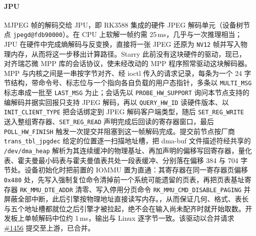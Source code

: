 \paragraph{JPU}
MJPEG 帧的解码交给 JPU，即 RK3588 集成的硬件 JPEG 解码单元（设备树节点 \texttt{jpegd@fdb90000}）。在 CPU 上软解一帧约需 25\,ms，几乎与一次推理相当；JPU 在硬件中完成熵解码与反变换，直接将一张 JPEG 还原为 \texttt{NV12} 帧并写入物理内存，从而将这一步移出计算路径。Starry 此前没有这块硬件的驱动，现已，对齐瑞芯微 MPP 库的会话协议，使未经改动的 MPP 程序照常驱动这块解码器。MPP 与内核之间是一串按字节对齐、经 ioctl 传入的请求记录，每条为一个 24 字节结构，带命令号、标志位与一个指向各自负载的用户态指针，多条以 \texttt{MULTI\_MSG} 标志串成一批至 \texttt{LAST\_MSG} 为止；会话先以 \texttt{PROBE\_HW\_SUPPORT} 询问本节点支持的编解码并据实回报只支持 JPEG 解码，再以 \texttt{QUERY\_HW\_ID} 读硬件版本、以 \texttt{INIT\_CLIENT\_TYPE} 把会话绑定到 JPEG 解码客户端类型，随后 \texttt{SET\_REG\_WRITE} 送入整组寄存器、\texttt{SET\_REG\_READ} 声明完成后回读的寄存器窗口，最后 \texttt{POLL\_HW\_FINISH} 触发一次提交并阻塞到这一帧解码完成。提交前节点按厂商 \texttt{trans\_tbl\_jpgdec} 给定的位置逐一扫描地址槽，把 dma-buf 文件描述符经共享的 \texttt{/dev/dma\_heap} 解析为其连续缓冲的物理基址、再加声明的偏移写回寄存器，量化表、霍夫曼最小码表与霍夫曼值表共处一段表缓冲、分别落在偏移 384 与 704 字节处。设备初始化时把前置的 IOMMU 置为直通：其寄存器在同一寄存器页偏移 \texttt{0x480} 处，先写入强制复位命令清掉前一个系统可能遗留的页表，再把页表基址寄存器 \texttt{RK\_MMU\_DTE\_ADDR} 清零、写入停用分页命令 \texttt{RK\_MMU\_CMD\_DISABLE\_PAGING} 并屏蔽全部中断，此后引擎按物理地址直接读写内存。，从而保证几何、格式、表长与五个地址槽都就位之后引擎才被拉起，绝不会在输入尚未配齐时就开始取数。开发板上单帧解码中位约 1\,ms，输出与 Linux 逐字节一致。该驱动以合并请求 \href{https://github.com/rcore-os/tgoskits/pull/1456}{\#1456} 提交至上游，已合并。

